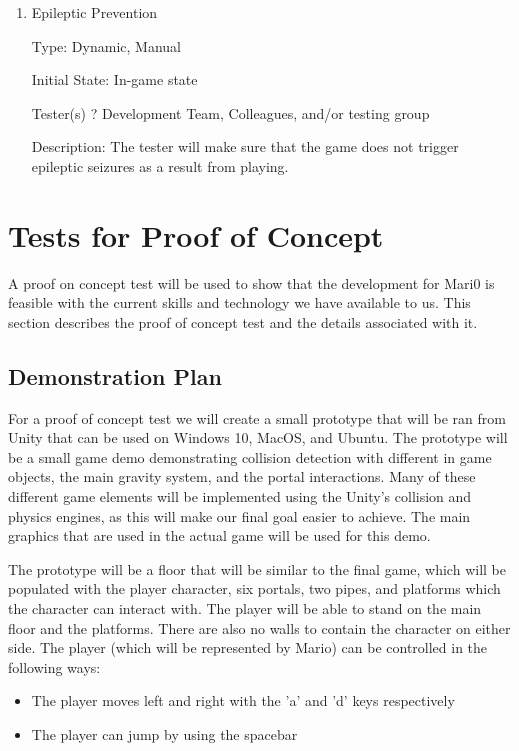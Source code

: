 \documentclass[12pt, titlepage]{article}
\begin{document}
\begin{enumerate}

\item{Epileptic Prevention\\}

Type: Dynamic, Manual

Initial State: In-game state

Tester(s) ? Development Team, Colleagues, and/or testing group

Description: The tester will make sure that the game does not trigger epileptic seizures as a result from playing.

\end{enumerate}

\section{Tests for Proof of Concept}

A proof on concept test will be used to show that the development for Mari0 is feasible with the current skills and technology we have available to us. This section describes the proof of concept test and the details associated with it.

\subsection{Demonstration Plan}
For a proof of concept test we will create a small prototype that will be ran from Unity that can be used on Windows 10, MacOS, and Ubuntu. The prototype will be a small game demo demonstrating collision detection with different in game objects, the main gravity system, and the portal interactions. Many of these different game elements will be implemented using the Unity's collision and physics engines, as this will make our final goal easier to achieve. The main  graphics that are used in the actual game will be used for this demo.

The prototype will be a floor that will be similar to the final game, which will be populated with the player character, six portals, two pipes, and platforms which the character can interact with. The player will be able to stand on the main floor and the platforms. There are also no walls to contain the character on either side.
The player (which will be represented by Mario) can be controlled in the following ways:
\begin{itemize}  
\item The player moves left and right with the 'a' and 'd' keys respectively
\item The player can jump by using the spacebar
\end{itemize}
\end{document}

